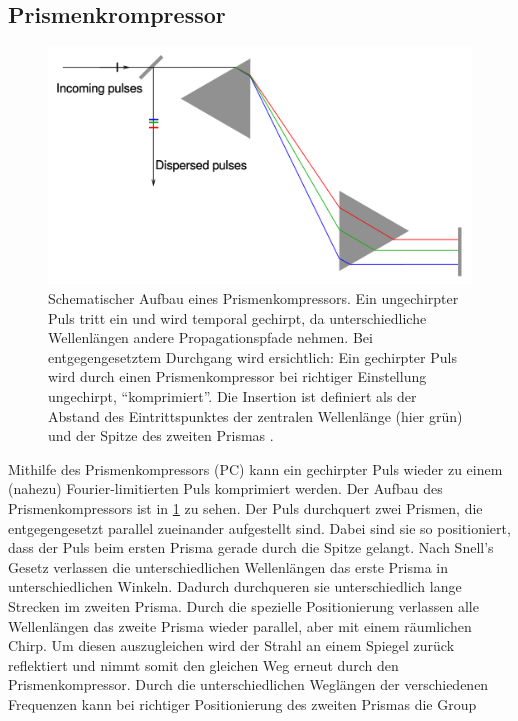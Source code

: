 \documentclass[twoside,        %
               BCOR12mm,       %
               english,ngerman, %
               fleqn,headsepline=false,footsepline=false
              ]{Vorlage/MFPREPORT}
\begin{document}
\subsection{Prismenkrompressor}
\begin{figure}[]
    \centering
    \includegraphics[width=\textwidth]{pc.png}
    \caption{Schematischer Aufbau eines Prismenkompressors. Ein ungechirpter
    Puls tritt ein und wird temporal gechirpt, da unterschiedliche Wellenlängen
    andere Propagationspfade nehmen. Bei entgegengesetztem Durchgang wird
    ersichtlich: Ein gechirpter Puls wird durch einen Prismenkompressor bei
    richtiger Einstellung ungechirpt, ``komprimiert''. Die Insertion ist definiert als der
    Abstand des Eintrittspunktes der zentralen Wellenlänge (hier grün) und der
    Spitze des zweiten Prismas .\cite{wikipc}}
    \label{fig:pc}
\end{figure}
Mithilfe des Prismenkompressors (PC) kann ein gechirpter Puls wieder zu einem
(nahezu) Fourier-limitierten Puls komprimiert werden. Der Aufbau des
Prismenkompressors ist in \cref{fig:pc} zu sehen. Der Puls durchquert zwei
Prismen, die entgegengesetzt parallel zueinander aufgestellt sind. Dabei sind
sie so positioniert, dass der Puls beim ersten Prisma gerade durch die Spitze
gelangt. Nach Snell's Gesetz verlassen die unterschiedlichen Wellenlängen
das erste Prisma in unterschiedlichen Winkeln. Dadurch durchqueren sie
unterschiedlich lange Strecken im zweiten Prisma. Durch die spezielle
Positionierung verlassen alle Wellenlängen das zweite Prisma wieder parallel,
aber mit einem räumlichen Chirp. Um diesen auszugleichen wird der Strahl an
einem Spiegel zurück reflektiert und nimmt somit den gleichen Weg erneut durch
den Prismenkompressor. Durch die unterschiedlichen Weglängen der verschiedenen
Frequenzen kann bei richtiger Positionierung des zweiten Prismas die Group
\end{document}
